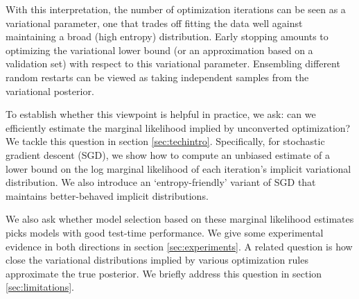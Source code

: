 \documentclass[]{article}
\begin{document}
With this interpretation, the number of optimization iterations can be seen as a variational parameter, one that trades off fitting the data well against maintaining a broad (high entropy) distribution.
Early stopping amounts to optimizing the variational lower bound (or an approximation based on a validation set) with respect to this variational parameter.
Ensembling different random restarts can be viewed as taking independent samples from the variational posterior.

To establish whether this viewpoint is helpful in practice, we ask: can we efficiently estimate the marginal likelihood implied by unconverted optimization?
We tackle this question in section \ref{sec:techintro}.
Specifically, for stochastic gradient descent (SGD), we show how to compute an unbiased estimate of a lower bound on the log marginal likelihood of each iteration's implicit variational distribution.
We also introduce an `entropy-friendly' variant of SGD that maintains better-behaved implicit distributions.

We also ask whether model selection based on these marginal likelihood estimates picks models with good test-time performance.
We give some experimental evidence in both directions in section \ref{sec:experiments}.
A related question is how close the variational distributions implied by various optimization rules approximate the true posterior.
We briefly address this question in section \ref{sec:limitations}.
\end{document}
